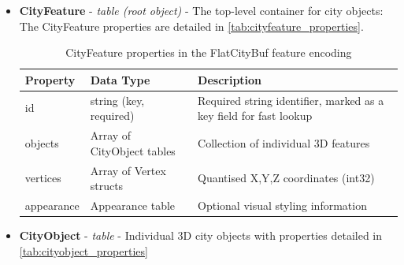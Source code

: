 \begin{itemize}
  \item \textbf{CityFeature} - \textit{table (root object)} - The top-level container for city objects:
    The CityFeature properties are detailed in \autoref{tab:cityfeature_properties}.

    \begin{table}[h]
      \centering
      \caption{CityFeature properties in the FlatCityBuf feature encoding}
      \label{tab:cityfeature_properties}
      \small
      \begin{tabularx}{\textwidth}{@{}llX@{}}
        \toprule
        \textbf{Property} & \textbf{Data Type} & \textbf{Description} \\
        \midrule
        id & string (key, required) & Required string identifier, marked as a key field for fast lookup \\
        objects & Array of CityObject tables & Collection of individual 3D features \\
        vertices & Array of Vertex structs & Quantised X,Y,Z coordinates (int32) \\
        appearance & Appearance table & Optional visual styling information \\
        \bottomrule
      \end{tabularx}
    \end{table}

  \item \textbf{CityObject} - \textit{table} - Individual 3D city objects with properties detailed in \autoref{tab:cityobject_properties}


\end{itemize}
